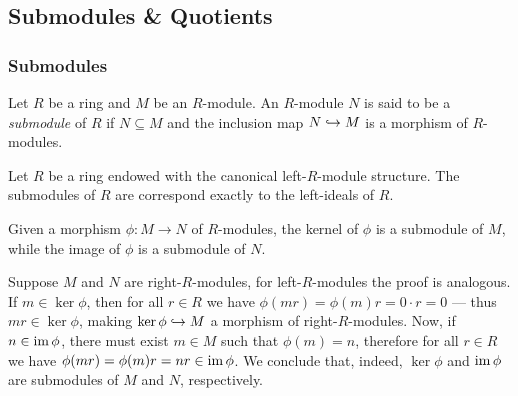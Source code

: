 \subsection{Submodules \& Quotients}

\subsubsection{Submodules}

\begin{definition}[Submodule]
\label{def:submodule}
Let \(R\) be a ring and \(M\) be an \(R\)-module. An \(R\)-module \(N\) is said
to be a \emph{submodule} of \(R\) if \(N \subseteq M\) and the inclusion map
\(N \hookrightarrow M\) is a morphism of \(R\)-modules.
\end{definition}

\begin{example}
\label{exp:R-submodules-are-ideals}
Let \(R\) be a ring endowed with the canonical left-\(R\)-module structure. The
submodules of \(R\) are correspond exactly to the left-ideals of \(R\).
\end{example}

\begin{example}
\label{exp:ker-im-are-submodules}
Given a morphism \(\phi: M \to N\) of \(R\)-modules, the kernel of \(\phi\) is a
submodule of \(M\), while the image of \(\phi\) is a submodule of \(N\).

Suppose \(M\) and \(N\) are right-\(R\)-modules, for left-\(R\)-modules the
proof is analogous. If \(m \in \ker \phi\), then for all \(r \in R\) we
have \(\phi(m r) = \phi(m) r = 0 \cdot r = 0\) --- thus \(m r \in \ker \phi\),
making \(\ker \phi \hookrightarrow M\) a morphism of right-\(R\)-modules. Now, if \(n \in
\operatorname{im} \phi\), there must exist \(m \in M\) such that \(\phi(m) = n\), therefore
for all \(r \in R\) we have \(\phi(m r) = \phi(m) r = n r \in \operatorname{im} \phi\). We
conclude that, indeed, \(\ker \phi\) and \(\operatorname{im} \phi\) are submodules of \(M\)
and \(N\), respectively.
\end{example}

